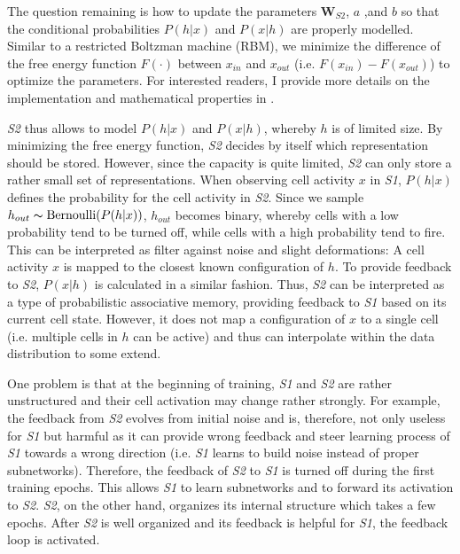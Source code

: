 The question remaining is how to update the parameters $\boldsymbol{W}_{S2}$, $a$ ,and $b$ so that the conditional probabilities $P(h|x)$ and $P(x|h)$ are properly modelled.
Similar to a restricted Boltzman machine (RBM), we minimize the difference of the free energy function $F(\cdot)$ between $x_{in}$ and $x_{out}$ (i.e. $F(x_{in}) - F(x_{out})$) to optimize the parameters. For interested readers, I provide more details on the implementation and mathematical properties in .

\emph{S2} thus allows to model $P(h|x)$ and $P(x|h)$, whereby $h$ is of limited size.
By minimizing the free energy function, \emph{S2} decides by itself which representation should be stored.
However, since the capacity is quite limited, \emph{S2} can only store a rather small set of representations.
When observing cell activity $x$ in \emph{S1}, $P(h|x)$ defines the probability for the cell activity in \emph{S2}. Since we sample $h_{out} \thicksim \text{Bernoulli}(P(h | x) )$, $h_{out}$ becomes binary, whereby cells with a low probability tend to be turned off, while cells with a high probability tend to fire.
This can be interpreted as filter against noise and slight deformations: A cell activity $x$ is mapped to the closest known configuration of $h$.
To provide feedback to \emph{S2}, $P(x|h)$ is calculated in a similar fashion. Thus, \emph{S2} can be interpreted as a type of probabilistic associative memory, providing feedback to \emph{S1} based on its current cell state.
However, it does not map a configuration of $x$ to a single cell (i.e. multiple cells in $h$ can be active) and thus can interpolate within the data distribution to some extend.

One problem is that at the beginning of training, \emph{S1} and \emph{S2} are rather unstructured and their cell activation may change rather strongly.
For example, the feedback from \emph{S2} evolves from initial noise and is, therefore, not only useless for \emph{S1} but harmful as it can provide wrong feedback and steer learning process of \emph{S1} towards a wrong direction (i.e. \emph{S1} learns to build noise instead of proper subnetworks).
Therefore, the feedback of \emph{S2} to \emph{S1} is turned off during the first training epochs.
This allows \emph{S1} to learn subnetworks and to forward its activation to \emph{S2}. \emph{S2}, on the other hand, organizes its internal structure which takes a few epochs.
After \emph{S2} is well organized and its feedback is helpful for \emph{S1}, the feedback loop is activated.



